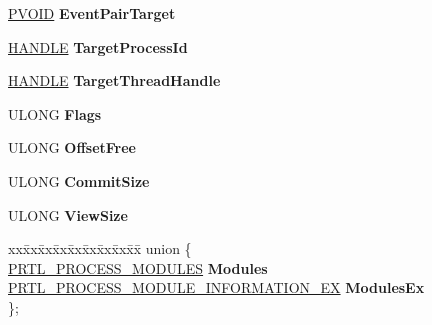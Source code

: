 \begin{DoxyCompactItemize}
\hyperlink{interfacevoid}{P\+V\+O\+ID} {\bfseries Event\+Pair\+Target}
\item 
\mbox{\label{struct___r_t_l___d_e_b_u_g___i_n_f_o_r_m_a_t_i_o_n_a6078bd4a5d9c50d3b602d946afb2d49a}} 
\hyperlink{interfacevoid}{H\+A\+N\+D\+LE} {\bfseries Target\+Process\+Id}
\item 
\mbox{\label{struct___r_t_l___d_e_b_u_g___i_n_f_o_r_m_a_t_i_o_n_a272218c10363712298a7fdac1f7fb7ee}} 
\hyperlink{interfacevoid}{H\+A\+N\+D\+LE} {\bfseries Target\+Thread\+Handle}
\item 
\mbox{\label{struct___r_t_l___d_e_b_u_g___i_n_f_o_r_m_a_t_i_o_n_aa92fe9282292557ae34a131bea50b57b}} 
U\+L\+O\+NG {\bfseries Flags}
\item 
\mbox{\label{struct___r_t_l___d_e_b_u_g___i_n_f_o_r_m_a_t_i_o_n_a8d87c281ed9496f20e2b774768deb63f}} 
U\+L\+O\+NG {\bfseries Offset\+Free}
\item 
\mbox{\label{struct___r_t_l___d_e_b_u_g___i_n_f_o_r_m_a_t_i_o_n_a29b90883725b45d0651f74914810a5b7}} 
U\+L\+O\+NG {\bfseries Commit\+Size}
\item 
\mbox{\label{struct___r_t_l___d_e_b_u_g___i_n_f_o_r_m_a_t_i_o_n_a76a79142cd14a0778c881461c7ab4c8a}} 
U\+L\+O\+NG {\bfseries View\+Size}
\item 
\mbox{\label{struct___r_t_l___d_e_b_u_g___i_n_f_o_r_m_a_t_i_o_n_a6d59a13fde7c42188772a20025b69f76}} 
\begin{tabbing}
xx\=xx\=xx\=xx\=xx\=xx\=xx\=xx\=xx\=\kill
union \{\\
\>\hyperlink{struct___r_t_l___p_r_o_c_e_s_s___m_o_d_u_l_e_s}{PRTL\_PROCESS\_MODULES} {\bfseries Modules}\\
\>\hyperlink{struct___r_t_l___p_r_o_c_e_s_s___m_o_d_u_l_e___i_n_f_o_r_m_a_t_i_o_n___e_x}{PRTL\_PROCESS\_MODULE\_INFORMATION\_EX} {\bfseries ModulesEx}\\
\}; \\


\end{tabbing}
\end{DoxyCompactItemize}
